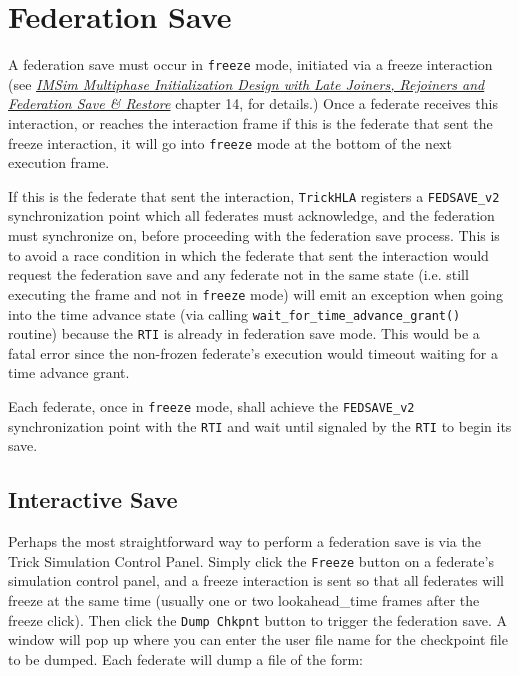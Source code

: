 \chapter{Federation Save}
\label{sec:hla_trick_fed_save}

A federation save must occur in {\tt freeze} mode, initiated via a freeze interaction (see
{\em \href{file:IMSim_Multiphase_Init_Design_Document.pdf}
          {IMSim Multiphase Initialization Design with Late Joiners, Rejoiners and Federation Save \& Restore}}
\cite{trickhlaenv:IMSim-multiphase-init-design}
chapter 14, for details.)
Once a federate receives this interaction, or reaches the
interaction frame if this is the federate that sent the freeze interaction,
it will go into {\tt freeze} mode at the bottom of the next execution frame.

If this is the federate that sent the interaction, {\tt TrickHLA} registers a {\tt FEDSAVE\_v2}
synchronization point which all federates must acknowledge, and the federation must
synchronize on, before proceeding with the federation save process. This is to avoid a
race condition in which the federate that sent the interaction would request the
federation save and any federate not in the same state (i.e. still executing the
frame and not in {\tt freeze} mode) will emit an exception when going into the time
advance state (via calling {\tt wait\_for\_time\_advance\_grant()} routine) because
the {\tt RTI} is already in federation save mode. This would be a fatal error since
the non-frozen federate's execution would timeout waiting for a time
advance grant.

Each federate, once in {\tt freeze} mode, shall achieve the {\tt FEDSAVE\_v2}
synchronization point with the {\tt RTI} and wait until signaled by the {\tt RTI} to
begin its save.

\section{Interactive Save }
\label{sec:interactive_save}

Perhaps the most straightforward way to perform a federation save is via the Trick Simulation Control Panel.
Simply click the {\tt Freeze} button on a federate's simulation control panel, and a freeze interaction is sent
so that all federates will freeze at the same time (usually one or two lookahead\_time frames after the freeze
click). Then click the {\tt Dump Chkpnt} button to trigger the federation save. A window will pop up where you 
can enter the user file name for the checkpoint file to be dumped. Each federate will dump a file of the form:

